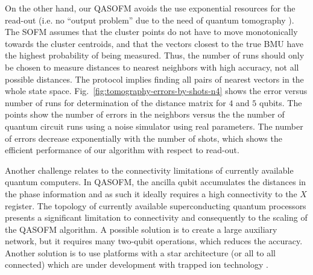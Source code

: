 \documentclass[pra,showkeys,twocolumn,showpacs,aps,10pt]{revtex4-2}
\begin{document}
On the other hand, our QASOFM avoids the use exponential resources for the read-out  (i.e. no ``output problem'' due to the need of quantum tomography \cite{biamonte2017}).
The SOFM assumes that the cluster points do not have to move monotonically towards the cluster centroids,
and that the vectors closest to the true BMU have the highest probability of being measured.
Thus, the number of runs should only be chosen to measure distances to nearest neighbors with high accuracy, not all possible distances. The protocol implies finding all pairs of nearest vectors in the whole state space.
Fig.~\ref{fig:tomography-errors-by-shots-n4} shows the error versus number of runs for determination of the distance matrix for $4$  and $5$ qubits.
The points show the number of errors in the neighbors versus the the number of quantum circuit runs using a noise simulator using real parameters.  The number of errors decrease exponentially with the number of shots, which shows the efficient performance of our algorithm with respect to read-out.

Another challenge relates to the connectivity limitations of currently available quantum computers. In QASOFM, the ancilla qubit accumulates the distances in the phase information and as such it ideally requires a high connectivity to the $X $ register.  The topology of currently available superconducting quantum processors  presents a significant limitation to connectivity and consequently to the scaling of the QASOFM algorithm.  A possible solution is to create a large auxiliary network,
but it requires many two-qubit operations, which reduces the accuracy.
Another solution is to use platforms with a star architecture (or all to all connected) which are under development with trapped ion technology \cite{QuantinuumsHSeriesHits}.
\end{document}
